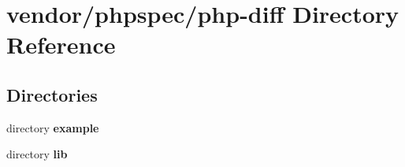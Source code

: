 \section{vendor/phpspec/php-\/diff Directory Reference}
\label{dir_7e9a0b7f81e30b50bcf712ceb4a97776}
\subsection*{Directories}
\begin{DoxyCompactItemize}
\item 
directory {\bf example}
\item 
directory {\bf lib}
\end{DoxyCompactItemize}
